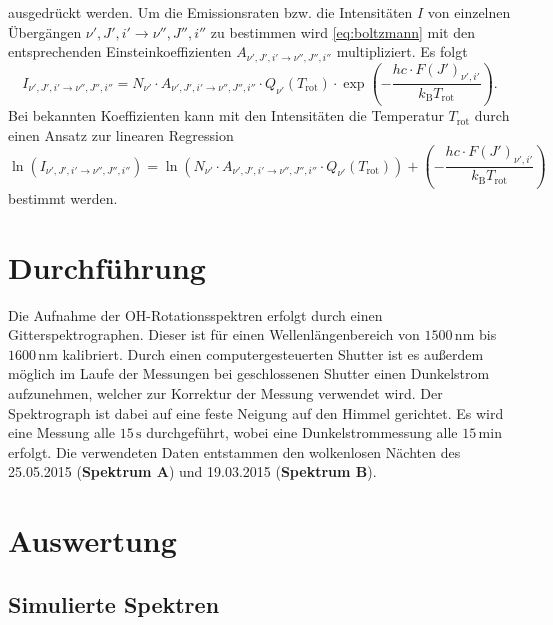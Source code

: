 \documentclass[numbers=noenddot,a4paper,notitlepage,twoside,BCOR15mm]{scrartcl}
\newcommand{\fett}[1]{\textbf{#1}}
\begin{document}
	ausgedrückt werden. Um die Emissionsraten bzw. die Intensitäten $I$ von einzelnen Übergängen $\nu', J', i' \rightarrow \nu'', J'', i''$ zu bestimmen wird \eqref{eq:boltzmann} mit den entsprechenden Einsteinkoeffizienten $A_{\nu', J', i' \rightarrow \nu'', J'', i''}$ multipliziert. Es folgt
	\begin{equation}
		I_{\nu', J', i' \rightarrow \nu'', J'', i''} = N_{\nu'}\cdot A_{\nu', J', i' \rightarrow \nu'', J'', i''}\cdot{Q_{\nu'}(T_\mathrm{rot})}\cdot \exp \left(-\frac{hc\cdot F(J')_{\nu', i'}}{k_\mathrm{B}T_\mathrm{rot}}\right).
	\end{equation}	
	Bei bekannten Koeffizienten kann mit den Intensitäten die Temperatur $T_\mathrm{rot}$ durch einen Ansatz zur linearen Regression
 \begin{equation}
 \label{eq:linreg}
 	\ln \left(	I_{\nu', J', i' \rightarrow \nu'', J'', i''}\right) = \ln \left(N_{\nu'}\cdot A_{\nu', J', i' \rightarrow \nu'', J'', i''}\cdot{Q_{\nu'}(T_\mathrm{rot})}\right) + \left(-\frac{hc\cdot F(J')_{\nu', i'}}{k_\mathrm{B}T_\mathrm{rot}}\right)
 \end{equation}	
 bestimmt werden. 
	\newpage
	\section{Durchführung}
	
	Die Aufnahme der OH-Rotationsspektren erfolgt durch einen Gitterspektrographen. Dieser ist für einen Wellenlängenbereich von $1500\,\mathrm{nm}$ bis $1600\,\mathrm{nm}$ kalibriert. Durch einen computergesteuerten Shutter ist es außerdem möglich im Laufe der Messungen bei geschlossenen Shutter einen Dunkelstrom aufzunehmen, welcher zur Korrektur der Messung verwendet wird. Der Spektrograph ist dabei auf eine feste Neigung auf den Himmel gerichtet. Es wird eine Messung alle $15\,\mathrm{s}$ durchgeführt, wobei eine Dunkelstrommessung alle $15\,\mathrm{min}$ erfolgt.  Die verwendeten Daten entstammen den wolkenlosen Nächten des 25.05.2015 (\fett{Spektrum A}) und 19.03.2015 (\fett{Spektrum B}).
	
	
	\newpage
	\section{Auswertung}
	
	\subsection{Simulierte Spektren}
	
\end{document}

